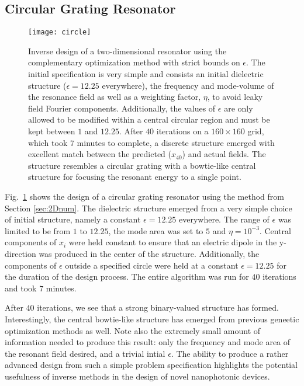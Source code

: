\documentclass[10pt,letterpaper]{article}
\begin{document}
\subsection{Circular Grating Resonator}
\begin{figure}[htbp]\centering
\texttt{[image: circle]}
\caption{Inverse design of a two-dimensional resonator using the complementary optimization method with strict bounds on $\epsilon$. The initial specification is very simple and consists an initial dielectric structure ($\epsilon=12.25$ everywhere), the frequency and mode-volume of the resonance field as well as a weighting factor, $\eta$, to avoid leaky field Fourier components. Additionally, the values of $\epsilon$ are only allowed to be modified within a central circular region and must be kept between $1$ and $12.25$. After $40$ iterations on a $160 \times 160$ grid, which took $7$ minutes to complete, a discrete structure emerged with excellent match between the predicted ($x_{40}$) and actual fields. The structure resembles a circular grating with a bowtie-like central structure for focusing the resonant energy to a single point.} 
\label{circle pic}
\end{figure}
Fig.~\ref{circle pic} shows the design of a circular grating resonator using the method from Section \ref{sec:2Dnum}. The dielectric structure emerged from a very simple choice of initial structure, namely a constant $\epsilon=12.25$ everywhere. The range of $\epsilon$ was limited to be from $1$ to $12.25$, the mode area was set to $5$ and $\eta= 10^{-3}$. Central components of $x_i$ were held constant to ensure that an electric dipole in the y-direction was produced in the center of the structure. Additionally, the components of $\epsilon$ outside a specified circle were held at a constant $\epsilon=12.25$ for the duration of the design process. The entire algorithm was run for $40$ iterations and took $7$ minutes.

After $40$ iterations, we see that a strong binary-valued structure has formed. Interestingly, the central bowtie-like structure has emerged from previous geneetic optimization methods as well\cite{Lip08}. Note also the extremely small amount of information needed to produce this result: only the frequency and mode area of the resonant field desired, and a trivial intial $\epsilon$. The ability to produce a rather advanced design from such a simple problem specification highlights the potential usefulness of inverse methods in the design of novel nanophotonic devices.
\end{document}
